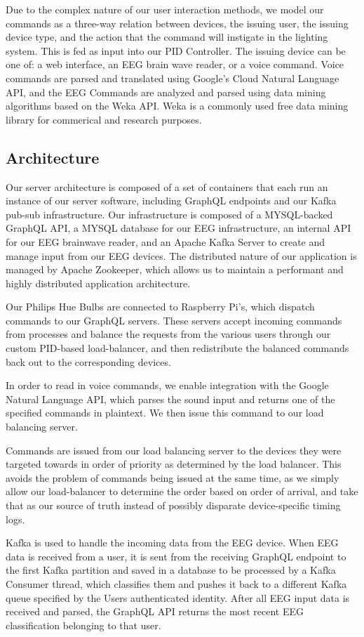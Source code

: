 \documentclass[10pt,twocolumn,letterpaper]{article}
\begin{document}
Due to the complex nature of our user interaction methods, we model our commands
as a three-way relation between devices, the issuing user, the issuing device
type, and the action that the command will instigate in the lighting system.
This is fed as input into our PID Controller. The issuing device can be one of:
a web interface, an EEG brain wave reader, or a voice command. Voice commands
are parsed and translated using Google's Cloud Natural Language API, and the EEG
Commands are analyzed and parsed using data mining algorithms based on
the Weka API. Weka is a commonly used free data mining library for commerical and research purposes. 

\subsection{Architecture}
Our server architecture is composed of a set of containers that each run an
instance of our server software, including GraphQL endpoints and our Kafka
pub-sub infrastructure. Our infrastructure is composed of a MYSQL-backed GraphQL
API, a MYSQL database for our EEG infrastructure, an internal API for our EEG
brainwave reader, and an Apache Kafka Server to create and manage input from our
EEG devices. The distributed nature of our application is managed by Apache
Zookeeper, which allows us to maintain a performant and highly distributed
application architecture.

Our Philips Hue Bulbs are connected to Raspberry Pi's, which dispatch commands to
our GraphQL servers. These servers accept incoming commands from processes and
balance the requests from the various users through our custom PID-based
load-balancer, and then redistribute the balanced commands back out to the
corresponding devices.

In order to read in voice commands, we enable integration with the Google
Natural Language API, which parses the sound input and returns one of the
specified commands in plaintext. We then issue this command to our load
balancing server.

Commands are issued from our load balancing server to the devices they were
targeted towards in order of priority as determined by the load balancer. This
avoids the problem of commands being issued at the same time, as we simply allow
our load-balancer to determine the order based on order of arrival, and take
that as our source of truth instead of possibly disparate device-specific timing
logs.

Kafka is used to handle the incoming data from the EEG device. When EEG data is
received from a user, it is sent from the receiving GraphQL endpoint to the
first Kafka partition and saved in a database to be processed by a Kafka
Consumer thread, which classifies them and pushes it back to a different
Kafka queue specified by the Users authenticated identity. After all EEG input
data is received and parsed, the GraphQL API returns the most recent EEG
classification belonging to that user.
\end{document}
